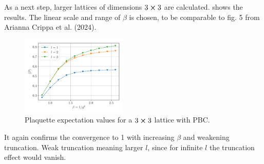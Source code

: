 As a next step, larger lattices of dimensions $3\cross3$ are calculated.  shows the results. The linear scale and range of $\beta$ is chosen, to be comparable to fig. 5 from Arianna Crippa et al. (2024)\cite{crippa2024}.
\begin{figure}[h]
	\begin{center}
		\includegraphics[width=0.45\textwidth]{images/PlaquetteExp3x3PBC.pdf}
	\end{center}
	\caption{Plaquette expectation values for a $3\cross3$ lattice with PBC.}\label{fig:3exp}
\end{figure}
\newpage
It again confirms the convergence to 1 with increasing $\beta$ and weakening truncation. Weak truncation meaning larger $l$, since for infinite $l$ the truncation effect would vanish.



